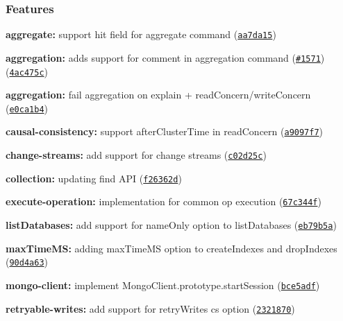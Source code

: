\subsubsection*{Features}


\begin{DoxyItemize}
\item {\bfseries aggregate\+:} support hit field for aggregate command (\href{https://github.com/mongodb/node-mongodb-native/commit/aa7da15}{\tt aa7da15})
\item {\bfseries aggregation\+:} adds support for comment in aggregation command (\href{https://github.com/mongodb/node-mongodb-native/issues/1571}{\tt \#1571}) (\href{https://github.com/mongodb/node-mongodb-native/commit/4ac475c}{\tt 4ac475c})
\item {\bfseries aggregation\+:} fail aggregation on explain + read\+Concern/write\+Concern (\href{https://github.com/mongodb/node-mongodb-native/commit/e0ca1b4}{\tt e0ca1b4})
\item {\bfseries causal-\/consistency\+:} support {\ttfamily after\+Cluster\+Time} in read\+Concern (\href{https://github.com/mongodb/node-mongodb-native/commit/a9097f7}{\tt a9097f7})
\item {\bfseries change-\/streams\+:} add support for change streams (\href{https://github.com/mongodb/node-mongodb-native/commit/c02d25c}{\tt c02d25c})
\item {\bfseries collection\+:} updating find A\+PI (\href{https://github.com/mongodb/node-mongodb-native/commit/f26362d}{\tt f26362d})
\item {\bfseries execute-\/operation\+:} implementation for common op execution (\href{https://github.com/mongodb/node-mongodb-native/commit/67c344f}{\tt 67c344f})
\item {\bfseries list\+Databases\+:} add support for name\+Only option to list\+Databases (\href{https://github.com/mongodb/node-mongodb-native/commit/eb79b5a}{\tt eb79b5a})
\item {\bfseries max\+Time\+MS\+:} adding max\+Time\+MS option to create\+Indexes and drop\+Indexes (\href{https://github.com/mongodb/node-mongodb-native/commit/90d4a63}{\tt 90d4a63})
\item {\bfseries mongo-\/client\+:} implement {\ttfamily Mongo\+Client.\+prototype.\+start\+Session} (\href{https://github.com/mongodb/node-mongodb-native/commit/bce5adf}{\tt bce5adf})
\item {\bfseries retryable-\/writes\+:} add support for {\ttfamily retry\+Writes} cs option (\href{https://github.com/mongodb/node-mongodb-native/commit/2321870}{\tt 2321870})

\end{DoxyItemize}
